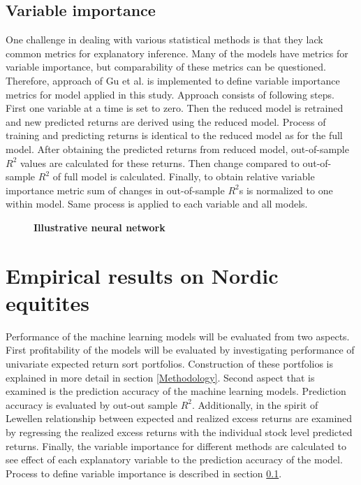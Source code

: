 \documentclass{article}
\begin{document}
\subsection{Variable importance} \label{VariableImportance}

One challenge in dealing with various statistical methods is that they lack common metrics for explanatory inference. Many of the models have metrics for variable importance, but comparability of these metrics can be questioned. Therefore, approach of Gu et al. \citeyear{guetal} is implemented to define variable importance metrics for model applied in this study. Approach consists of following steps. First one variable at a time is set to zero. Then the reduced model is retrained and new predicted returns are derived using the reduced model. Process of training and predicting returns is identical to the reduced model as for the full model. After obtaining the predicted returns from reduced model, out-of-sample $R^2$ values are calculated for these returns. Then change compared to out-of-sample $R^2$ of full model is calculated. Finally, to obtain relative variable importance metric sum of changes in out-of-sample $R^2$s is normalized to one within model. Same process is applied to each variable and all models.

\begin{figure}
\centering
\caption[Illustrative neural network]{\textbf{Illustrative neural network}\\  }

\label{plot:NN}
\end{figure}

\section{Empirical results on Nordic equitites}

Performance of the machine learning models will be evaluated from two aspects. First profitability of the models will be evaluated by investigating performance of univariate expected return sort portfolios. Construction of these portfolios is explained in more detail in section \ref{Methodology}. Second aspect that is examined is the prediction accuracy of the machine learning models. Prediction accuracy is evaluated by out-out sample $R^2$. Additionally, in the spirit of Lewellen \citeyear{lewellen2015} relationship between expected and realized excess returns are examined by regressing the realized excess returns with the individual stock level predicted returns. Finally, the variable importance for different methods are calculated to see effect of each explanatory variable to the prediction accuracy of the model. Process to define variable importance is described in section \ref{VariableImportance}.
\end{document}
